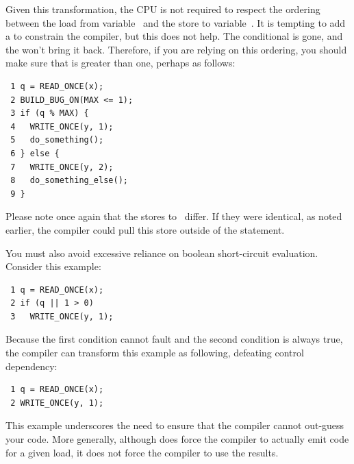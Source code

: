 Given this transformation, the CPU is not required to respect the ordering
between the load from variable~ and the store to variable~.
It is tempting to add a  to constrain the compiler,
but this does not help.
The conditional is gone, and the  won't bring it back.
Therefore, if you are relying on this ordering, you should make sure
that  is greater than one, perhaps as follows:

\vspace{5pt}
\begin{minipage}[t]{\columnwidth}
\scriptsize
\begin{verbatim}
 1 q = READ_ONCE(x);
 2 BUILD_BUG_ON(MAX <= 1);
 3 if (q % MAX) {
 4   WRITE_ONCE(y, 1);
 5   do_something();
 6 } else {
 7   WRITE_ONCE(y, 2);
 8   do_something_else();
 9 }
\end{verbatim}
\end{minipage}
\vspace{5pt}

Please note once again that the stores to~ differ.
If they were identical, as noted earlier, the compiler could pull this
store outside of the  statement.

You must also avoid excessive reliance on boolean short-circuit evaluation.
Consider this example:

\vspace{5pt}
\begin{minipage}[t]{\columnwidth}
\scriptsize
\begin{verbatim}
 1 q = READ_ONCE(x);
 2 if (q || 1 > 0)
 3   WRITE_ONCE(y, 1);
\end{verbatim}
\end{minipage}
\vspace{5pt}

Because the first condition cannot fault and the second condition is
always true, the compiler can transform this example as following,
defeating control dependency:

\vspace{5pt}
\begin{minipage}[t]{\columnwidth}
\scriptsize
\begin{verbatim}
 1 q = READ_ONCE(x);
 2 WRITE_ONCE(y, 1);
\end{verbatim}
\end{minipage}
\vspace{5pt}

This example underscores the need to ensure that the compiler cannot
out-guess your code.
More generally, although  does force
the compiler to actually emit code for a given load, it does not force
the compiler to use the results.

